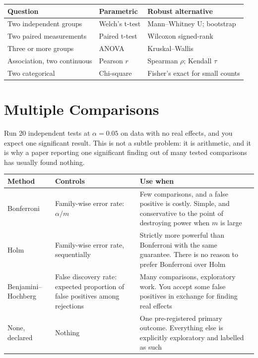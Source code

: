 \begin{center}
\small
\begin{tabular}{@{}L{4.2cm}L{4.6cm}L{5.1cm}@{}}
\toprule
\textbf{Question} & \textbf{Parametric} & \textbf{Robust alternative} \\
\midrule
Two independent groups   & Welch's t-test & Mann--Whitney U; bootstrap \\
Two paired measurements  & Paired t-test  & Wilcoxon signed-rank \\
Three or more groups     & ANOVA          & Kruskal--Wallis \\
Association, two continuous & Pearson $r$ & Spearman $\rho$; Kendall $\tau$ \\
Two categorical          & Chi-square     & Fisher's exact for small counts \\
\bottomrule
\end{tabular}
\end{center}

\section{Multiple Comparisons}

Run 20 independent tests at $\alpha = 0.05$ on data with no real effects, and
you expect one significant result. This is not a subtle problem: it is
arithmetic, and it is why a paper reporting one significant finding out of many
tested comparisons has usually found nothing.

\begin{center}
\small
\begin{tabular}{@{}L{2.8cm}L{4.4cm}L{6.9cm}@{}}
\toprule
\textbf{Method} & \textbf{Controls} & \textbf{Use when} \\
\midrule
Bonferroni
  & Family-wise error rate: $\alpha/m$
  & Few comparisons, and a false positive is costly. Simple, and conservative
    to the point of destroying power when $m$ is large \\
Holm
  & Family-wise error rate, sequentially
  & Strictly more powerful than Bonferroni with the same guarantee. There is no
    reason to prefer Bonferroni over Holm~\cite{holm1979simple} \\
Benjamini--Hochberg
  & False discovery rate: expected proportion of false positives among
    rejections
  & Many comparisons, exploratory work. You accept some false positives in
    exchange for finding real effects~\cite{benjamini1995controlling} \\
None, declared
  & Nothing
  & One pre-registered primary outcome. Everything else is explicitly
    exploratory and labelled as such \\
\bottomrule
\end{tabular}
\end{center}


